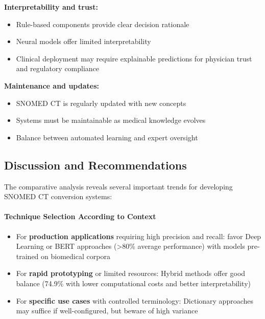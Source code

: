 \textbf{Interpretability and trust:}
\begin{itemize}
    \item Rule-based components provide clear decision rationale
    \item Neural models offer limited interpretability
    \item Clinical deployment may require explainable predictions for physician trust and regulatory compliance
\end{itemize}

\textbf{Maintenance and updates:}
\begin{itemize}
    \item SNOMED CT is regularly updated with new concepts
    \item Systems must be maintainable as medical knowledge evolves
    \item Balance between automated learning and expert oversight
\end{itemize}

\subsection{Discussion and Recommendations}

The comparative analysis reveals several important trends for developing SNOMED CT conversion systems:

\paragraph{Technique Selection According to Context}
\begin{itemize}
    \item For \textbf{production applications} requiring high precision and recall: favor Deep Learning or BERT approaches (>80\% average performance) with models pre-trained on biomedical corpora
    \item For \textbf{rapid prototyping} or limited resources: Hybrid methods offer good balance (74.9\% with lower computational costs and better interpretability)
    \item For \textbf{specific use cases} with controlled terminology: Dictionary approaches may suffice if well-configured, but beware of high variance
\end{itemize}

